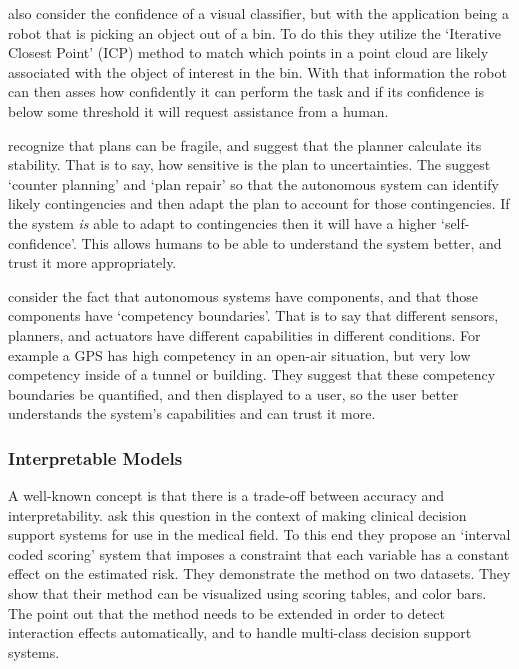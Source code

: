     \citet{Kaipa2015-hy} also consider the confidence of a visual classifier, but with the application being a robot that is picking an object out of a bin. To do this they utilize the `Iterative Closest Point' (ICP) method to match which points in a point cloud are likely associated with the object of interest in the bin. With that information the robot can then asses how confidently it can perform the task and if its confidence is below some threshold it will request assistance from a human. 

    \citet{Kuter2015-qh} recognize that plans can be fragile, and suggest that the planner calculate its stability. That is to say, how sensitive is the plan to uncertainties. The suggest `counter planning' and `plan repair' so that the autonomous system can identify likely contingencies and then adapt the plan to account for those contingencies. If the system \emph{is} able to adapt to contingencies then it will have a higher `self-confidence'. This allows humans to be able to understand the system better, and trust it more appropriately.

    \citet{Hutchins2015-if} consider the fact that autonomous systems have components, and that those components have `competency boundaries'. That is to say that different sensors, planners, and actuators have different capabilities in different conditions. For example a GPS has high competency in an open-air situation, but very low competency inside of a tunnel or building. They suggest that these competency boundaries be quantified, and then displayed to a user, so the user better understands the system's capabilities and can trust it more.

\subsubsection{Interpretable Models}
    A well-known concept is that there is a trade-off between accuracy and interpretability. \citet{Van_Belle2012-dt} ask this question in the context of making clinical decision support systems for use in the medical field. To this end they propose an `interval coded scoring' system that imposes a constraint that each variable has a constant effect on the estimated risk. They demonstrate the method on two datasets. They show that their method can be visualized using scoring tables, and color bars. The point out that the method needs to be extended in order to detect interaction effects automatically, and to handle multi-class decision support systems.

